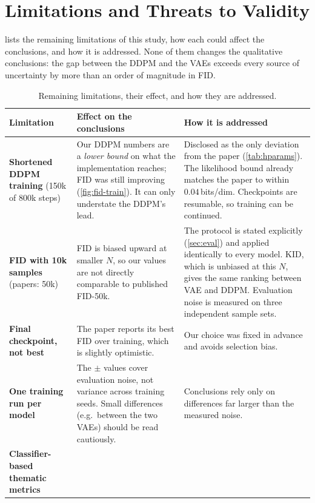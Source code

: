 \section{Limitations and Threats to Validity}
\label{sec:limitations}

 lists the remaining limitations of this study, how each could affect the conclusions, and
how it is addressed. None of them changes the qualitative conclusions: the gap between the DDPM and the VAEs
exceeds every source of uncertainty by more than an order of magnitude in FID.

\begin{table}[H]
\centering\small
\caption{Remaining limitations, their effect, and how they are addressed.}
\label{tab:limitations}
\begin{tabularx}{\textwidth}{@{}>{\raggedright\arraybackslash}p{3.3cm}>{\raggedright\arraybackslash}X>{\raggedright\arraybackslash}X@{}}
\toprule
Limitation & Effect on the conclusions & How it is addressed\\
\midrule
\textbf{Shortened DDPM training} (150k of 800k steps) &
Our DDPM numbers are a \emph{lower bound} on what the implementation reaches; FID was still improving
(\cref{fig:fid-train}). It can only understate the DDPM's lead. &
Disclosed as the only deviation from the paper (\cref{tab:hparams}). The likelihood bound already matches the paper
to within $0.04$\,bits/dim. Checkpoints are resumable, so training can be continued.\\
\addlinespace
\textbf{FID with 10k samples} (papers: 50k) &
FID is biased upward at smaller $N$, so our values are not directly comparable to published FID-50k. &
The protocol is stated explicitly (\cref{sec:eval}) and applied identically to every model. KID, which is unbiased
at this $N$, gives the same ranking between VAE and DDPM. Evaluation noise is measured on three independent sample
sets.\\
\addlinespace
\textbf{Final checkpoint, not best} &
The paper reports its best FID over training, which is slightly optimistic. &
Our choice was fixed in advance and avoids selection bias.\\
\addlinespace
\textbf{One training run per model} &
The $\pm$ values cover evaluation noise, not variance across training seeds. Small differences (e.g.\ between the
two VAEs) should be read cautiously. &
Conclusions rely only on differences far larger than the measured noise.\\
\addlinespace
\textbf{Classifier-based thematic metrics} &

\end{tabularx}
\end{table}
